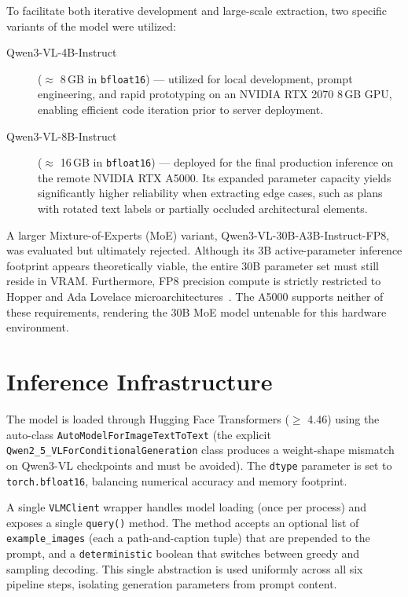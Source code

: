 \documentclass[12pt,a4paper,openright]{report}
\newcommand{\code}[1]{\texttt{#1}}
\begin{document}
To facilitate both iterative development and large-scale extraction, two specific variants of the model were utilized:

\begin{description}
    \item[Qwen3-VL-4B-Instruct] ($\approx$ 8\,GB in \texttt{bfloat16}) --- utilized for local development, prompt engineering, and rapid prototyping on an NVIDIA RTX 2070 8\,GB GPU, enabling efficient code iteration prior to server deployment.
    \item[Qwen3-VL-8B-Instruct] ($\approx$ 16\,GB in \texttt{bfloat16}) --- deployed for the final production inference on the remote NVIDIA RTX A5000. Its expanded parameter capacity yields significantly higher reliability when extracting edge cases, such as plans with rotated text labels or partially occluded architectural elements.
\end{description}

A larger Mixture-of-Experts (MoE) variant, Qwen3-VL-30B-A3B-Instruct-FP8, was evaluated but ultimately rejected. Although its 3B active-parameter inference footprint appears theoretically viable, the entire 30B parameter set must still reside in VRAM. Furthermore, FP8 precision compute is strictly restricted to Hopper and Ada Lovelace microarchitectures~\cite{vllm_fp8_w8a8}. The A5000 supports neither of these requirements, rendering the 30B MoE model untenable for this hardware environment.

\section{Inference Infrastructure}

The model is loaded through Hugging Face Transformers ($\geq$ 4.46) using the auto-class \code{AutoModelForImageTextToText} (the explicit \code{Qwen2\_5\_VLForConditionalGeneration} class produces a weight-shape mismatch on Qwen3-VL checkpoints and must be avoided). The \code{dtype} parameter is set to \code{torch.bfloat16}, balancing numerical accuracy and memory footprint.

A single \code{VLMClient} wrapper handles model loading (once per process) and exposes a single \code{query()} method. The method accepts an optional list of \code{example\_images} (each a path-and-caption tuple) that are prepended to the prompt, and a \code{deterministic} boolean that switches between greedy and sampling decoding. This single abstraction is used uniformly across all six pipeline steps, isolating generation parameters from prompt content.
\end{document}
